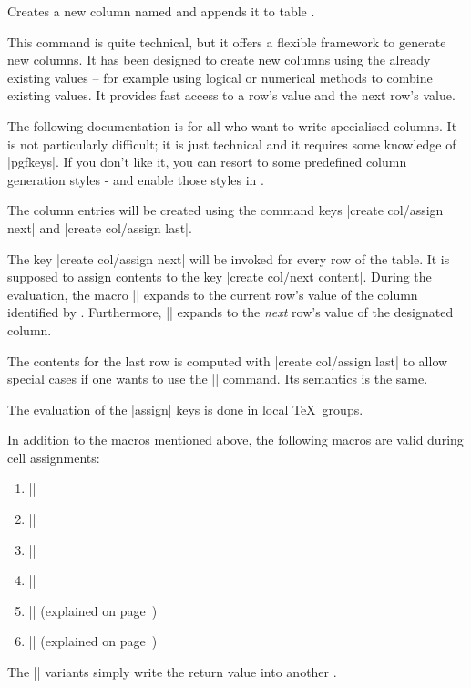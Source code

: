 \begin{command}{}
Creates a new column named  and appends it to table .

This command is quite technical, but it offers a flexible framework to generate new columns. It has been designed to create new columns using the already existing values -- for example using logical or numerical methods to combine existing values. It provides fast access to a row's value and the next row's value.

The following documentation is for all who want to write specialised columns. It is not particularly difficult; it is just technical and it requires some knowledge of |pgfkeys|. If you don't like it, you can resort to some predefined column generation styles - and enable those styles in .

The column entries will be created using the command keys |create col/assign next| and |create col/assign last|.

The key |create col/assign next| will be invoked for every row of the table.
It is supposed to assign contents to the key |create col/next content|.
During the evaluation, the macro |\thisrow| 
expands to the current row's value of the column identified by .
Furthermore, |\nextrow| expands to the \emph{next} row's
value of the designated column.

The contents for the last row is computed with |create col/assign last| to allow special cases if one wants to use the |\nextrow| command. Its semantics is the same.

The evaluation of the |assign| keys is done in local \TeX\ groups.

In addition to the macros mentioned above, the following macros are valid during cell assignments:
\begin{enumerate}
	\item |\thisrow|
	\item |\getthisrow|
	\item |\nextrow|
	\item |\getnextrow|
	\item |\pgfplotstablerow| (explained on page~\pageref{pgfplotstable:page:tablerow})
	\item |\pgfplotstablerows| (explained on page~\pageref{pgfplotstable:page:tablerow})
\end{enumerate}
The |\get| variants simply write the return value into another .


\end{command}
